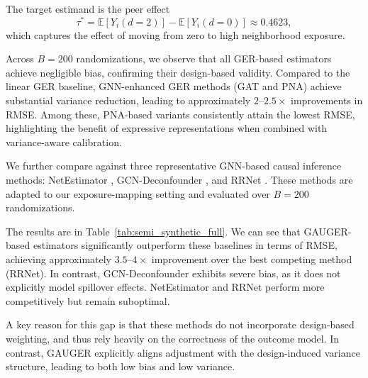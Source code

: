 \documentclass{article}
\theoremstyle{plain}
\theoremstyle{definition}
\theoremstyle{remark}
\begin{document}
The target estimand is the peer effect
\[
\tau^* = \mathbb{E}[Y_i(d{=}2)] - \mathbb{E}[Y_i(d{=}0)] \approx 0.4623,
\]
which captures the effect of moving from zero to high neighborhood exposure.

Across $B=200$ randomizations, we observe that all GER-based estimators achieve negligible bias, confirming their design-based validity. Compared to the linear GER baseline, GNN-enhanced GER methods (GAT and PNA) achieve substantial variance reduction, leading to approximately $2$--$2.5\times$ improvements in RMSE. Among these, PNA-based variants consistently attain the lowest RMSE, highlighting the benefit of expressive representations when combined with variance-aware calibration.

We further compare against three representative GNN-based causal inference methods: NetEstimator \citep{jiang2022estimating}, GCN-Deconfounder \citep{guo2020learning}, and RRNet \citep{cai2023generalization}. These methods are adapted to our exposure-mapping setting and evaluated over $B=200$ randomizations.

The results are in Table~\ref{tab:semi_synthetic_full}. We can see that GAUGER-based estimators significantly outperform these baselines in terms of RMSE, achieving approximately $3.5$--$4\times$ improvement over the best competing method (RRNet). In contrast, GCN-Deconfounder exhibits severe bias, as it does not explicitly model spillover effects. NetEstimator and RRNet perform more competitively but remain suboptimal.

A key reason for this gap is that these methods do not incorporate design-based weighting, and thus rely heavily on the correctness of the outcome model. In contrast, GAUGER explicitly aligns adjustment with the design-induced variance structure, leading to both low bias and low variance.
\end{document}
